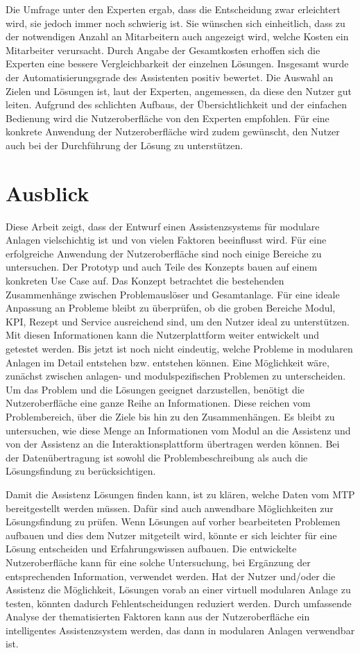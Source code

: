 Die Umfrage unter den Experten ergab, dass die Entscheidung zwar erleichtert wird, sie jedoch immer noch schwierig ist. Sie wünschen sich einheitlich, dass zu der notwendigen Anzahl an Mitarbeitern auch angezeigt wird, welche Kosten ein Mitarbeiter verursacht. Durch Angabe der Gesamtkosten erhoffen sich die Experten eine bessere Vergleichbarkeit der einzelnen Lösungen. Insgesamt wurde der Automatisierungsgrade des Assistenten positiv bewertet. Die Auswahl an Zielen und Lösungen ist, laut der Experten, angemessen, da diese den Nutzer gut leiten. Aufgrund des schlichten Aufbaus, der Übersichtlichkeit und der einfachen Bedienung wird die Nutzeroberfläche von den Experten empfohlen. Für eine konkrete Anwendung der Nutzeroberfläche wird zudem gewünscht, den Nutzer auch bei der Durchführung der Lösung zu unterstützen.

\section{Ausblick}
Diese Arbeit zeigt, dass der Entwurf einen Assistenzsystems für modulare Anlagen vielschichtig ist und von vielen Faktoren beeinflusst wird. Für eine erfolgreiche Anwendung der Nutzeroberfläche sind noch einige Bereiche zu untersuchen. Der Prototyp und auch Teile des Konzepts bauen auf einem konkreten Use Case auf. Das Konzept betrachtet die bestehenden Zusammenhänge zwischen Problemauslöser und Gesamtanlage. Für eine ideale Anpassung an Probleme bleibt zu überprüfen, ob die groben Bereiche Modul, KPI, Rezept und Service ausreichend sind, um den Nutzer ideal zu unterstützen. Mit diesen Informationen kann die Nutzerplattform weiter entwickelt und getestet werden. Bis jetzt ist noch nicht eindeutig, welche Probleme in modularen Anlagen im Detail entstehen bzw. entstehen können.  Eine Möglichkeit wäre, zunächst zwischen anlagen- und modulspezifischen Problemen zu unterscheiden. Um das Problem und die Lösungen geeignet darzustellen, benötigt die Nutzeroberfläche eine ganze Reihe an Informationen. Diese reichen vom Problembereich, über die Ziele bis hin zu den Zusammenhängen. Es bleibt zu untersuchen, wie diese Menge an Informationen vom Modul an die Assistenz und von der Assistenz an die Interaktionsplattform übertragen werden können. Bei der Datenübertragung ist sowohl die Problembeschreibung als auch die Lösungsfindung zu berücksichtigen.

Damit die Assistenz Lösungen finden kann, ist zu klären, welche Daten vom MTP bereitgestellt werden müssen. Dafür sind auch anwendbare Möglichkeiten zur Lösungsfindung zu prüfen. Wenn Lösungen auf vorher bearbeiteten Problemen aufbauen und dies dem Nutzer mitgeteilt wird, könnte er sich leichter für eine Lösung entscheiden und Erfahrungswissen aufbauen. Die entwickelte Nutzeroberfläche kann für eine solche Untersuchung, bei Ergänzung der entsprechenden Information, verwendet werden. Hat der Nutzer und/oder die Assistenz die Möglichkeit, Lösungen vorab an einer virtuell modularen Anlage zu testen, könnten dadurch Fehlentscheidungen reduziert werden. Durch umfassende Analyse der thematisierten Faktoren kann aus der Nutzeroberfläche ein intelligentes Assistenzsystem werden, das dann in modularen Anlagen verwendbar ist.